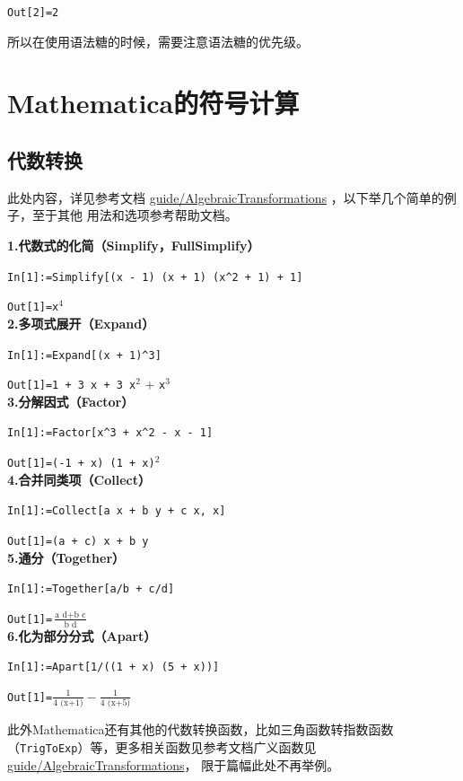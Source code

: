 \documentclass[UTF8,a4paper,10pt]{ctexart}
\begin{document}
\verb|Out[2]=2|

所以在使用语法糖的时候，需要注意语法糖的优先级。

\section{Mathematica的符号计算}


\subsection{代数转换}

此处内容，详见参考文档
\href{http://reference.wolfram.com/language/guide/AlgebraicTransformations.html}{guide/AlgebraicTransformations}
，以下举几个简单的例子，至于其他
用法和选项参考帮助文档。

\textbf{1.代数式的化简（Simplify，FullSimplify）}

\verb|In[1]:=Simplify[(x - 1) (x + 1) (x^2 + 1) + 1]|

\verb|Out[1]=x|$^4$
\\

\textbf{2.多项式展开（Expand）}

\verb|In[1]:=Expand[(x + 1)^3]|

\verb|Out[1]=1 + 3 x + 3 x|$^2$ + \verb|x|$^3$
\\

\textbf{3.分解因式（Factor）}

\verb|In[1]:=Factor[x^3 + x^2 - x - 1]|

\verb|Out[1]=(-1 + x) (1 + x)|$^2$
\\

\textbf{4.合并同类项（Collect）}

\verb|In[1]:=Collect[a x + b y + c x, x]|

\verb|Out[1]=(a + c) x + b y|
\\

\textbf{5.通分（Together）}

\verb|In[1]:=Together[a/b + c/d]|

\verb|Out[1]=|$\frac{\text{a d}+\text{b c}}{\text{b d}}$
\\

\textbf{6.化为部分分式（Apart）}

\verb|In[1]:=Apart[1/((1 + x) (5 + x))]|

\verb|Out[1]=|$\frac{1}{\text{4 (x+1)}}-\frac{1}{\text{4 (x+5)}}$


此外Mathematica还有其他的代数转换函数，比如三角函数转指数函数（\verb|TrigToExp|）等，更多相关函数见参考文档广义函数见
\href{http://reference.wolfram.com/language/guide/AlgebraicTransformations.html}{guide/AlgebraicTransformations}，
限于篇幅此处不再举例。
\end{document}
